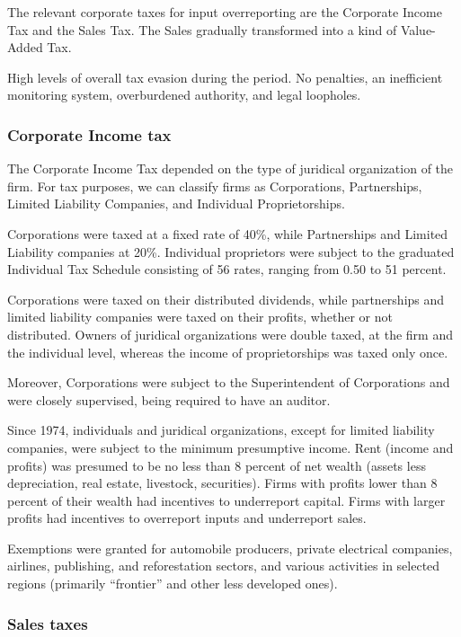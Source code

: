 \documentclass[
  12pt]{article}
\begin{document}
The relevant corporate taxes for input overreporting are the Corporate
Income Tax and the Sales Tax. The Sales gradually transformed into a
kind of Value-Added Tax.

High levels of overall tax evasion during the period. No penalties, an
inefficient monitoring system, overburdened authority, and legal
loopholes.

\hypertarget{corporate-income-tax}{%
\subsubsection{Corporate Income tax}\label{corporate-income-tax}}

The Corporate Income Tax depended on the type of juridical organization
of the firm. For tax purposes, we can classify firms as Corporations,
Partnerships, Limited Liability Companies, and Individual
Proprietorships.

Corporations were taxed at a fixed rate of 40\%, while Partnerships and
Limited Liability companies at 20\%. Individual proprietors were subject
to the graduated Individual Tax Schedule consisting of 56 rates, ranging
from 0.50 to 51 percent.

Corporations were taxed on their distributed dividends, while
partnerships and limited liability companies were taxed on their
profits, whether or not distributed. Owners of juridical organizations
were double taxed, at the firm and the individual level, whereas the
income of proprietorships was taxed only once.

Moreover, Corporations were subject to the Superintendent of
Corporations and were closely supervised, being required to have an
auditor.

Since 1974, individuals and juridical organizations, except for limited
liability companies, were subject to the minimum presumptive income.
Rent (income and profits) was presumed to be no less than 8 percent of
net wealth (assets less depreciation, real estate, livestock,
securities). Firms with profits lower than 8 percent of their wealth had
incentives to underreport capital. Firms with larger profits had
incentives to overreport inputs and underreport sales.

Exemptions were granted for automobile producers, private electrical
companies, airlines, publishing, and reforestation sectors, and various
activities in selected regions (primarily ``frontier'' and other less
developed ones).

\hypertarget{sales-taxes}{%
\subsubsection{Sales taxes}\label{sales-taxes}}
\end{document}
